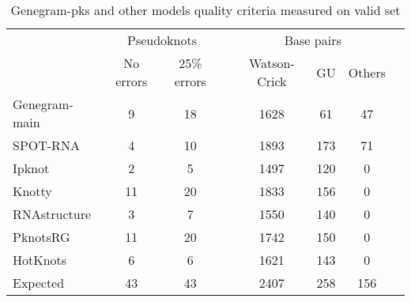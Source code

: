 \begin{table}
\centering
\caption{Genegram-pks and other models quality criteria measured on valid set}
\begin{tabular}{@{}lccccccc@{}}\toprule
& \multicolumn{2}{c}{Pseudoknots} & \phantom{abc}& \multicolumn{3}{c}{Base pairs} \\
& No errors & 25\% errors  && Watson-Crick & GU & Others \\ \cmidrule{2-3} \cmidrule{5-7} 
Genegram-main  & 9 & 18 && 1628 & 61 & 47 \\
SPOT-RNA & 4 & 10 && 1893 & 173 & 71 \\
Ipknot & 2 & 5 && 1497 & 120 & 0 \\
Knotty & 11 & 20 && 1833 & 156 & 0 \\
RNAstructure & 3 & 7 && 1550 & 140 & 0 \\
PknotsRG & 11 & 20 && 1742 & 150 & 0 \\
HotKnots & 6 & 6 && 1621 & 143 & 0 \\
\bottomrule
Expected & 43 & 43 && 2407 & 258 & 156 \\
\bottomrule
\end{tabular}
\label{table_pks}
\end{table}